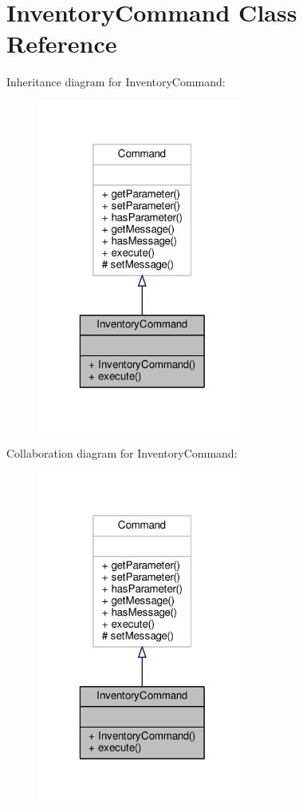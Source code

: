 \hypertarget{classInventoryCommand}{\section{Inventory\-Command Class Reference}
\label{classInventoryCommand}
}


Inheritance diagram for Inventory\-Command\-:
\nopagebreak
\begin{figure}[H]
\begin{center}
\leavevmode
\includegraphics[width=196pt]{classInventoryCommand__inherit__graph}
\end{center}
\end{figure}


Collaboration diagram for Inventory\-Command\-:
\nopagebreak
\begin{figure}[H]
\begin{center}
\leavevmode
\includegraphics[width=196pt]{classInventoryCommand__coll__graph}
\end{center}
\end{figure}
